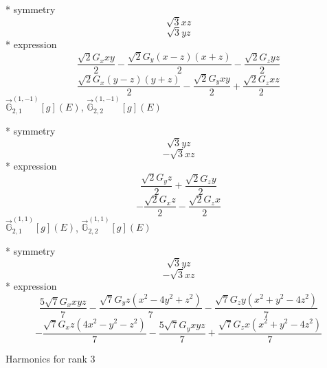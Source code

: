 \documentclass[fleqn,8pt]{jsarticle}
\begin{document}
\noindent\quad ** symmetry
\begin{dmath*}
\sqrt{3} x z
\end{dmath*}
\begin{dmath*}
\sqrt{3} y z
\end{dmath*}
\noindent\quad ** expression
\begin{dmath*}
\frac{\sqrt{2} G_{x} x y}{2} - \frac{\sqrt{2} G_{y} \left(x - z\right) \left(x + z\right)}{2} - \frac{\sqrt{2} G_{z} y z}{2}
\end{dmath*}
\begin{dmath*}
\frac{\sqrt{2} G_{x} \left(y - z\right) \left(y + z\right)}{2} - \frac{\sqrt{2} G_{y} x y}{2} + \frac{\sqrt{2} G_{z} x z}{2}
\end{dmath*}
\noindent\quad $\vec{\mathbb{G}}_{2,1}^{(1,-1)}[g](E)$, $\vec{\mathbb{G}}_{2,2}^{(1,-1)}[g](E)$

\noindent\quad ** symmetry
\begin{dmath*}
\sqrt{3} y z
\end{dmath*}
\begin{dmath*}
- \sqrt{3} x z
\end{dmath*}
\noindent\quad ** expression
\begin{dmath*}
\frac{\sqrt{2} G_{y} z}{2} + \frac{\sqrt{2} G_{z} y}{2}
\end{dmath*}
\begin{dmath*}
- \frac{\sqrt{2} G_{x} z}{2} - \frac{\sqrt{2} G_{z} x}{2}
\end{dmath*}
\noindent\quad $\vec{\mathbb{G}}_{2,1}^{(1,1)}[g](E)$, $\vec{\mathbb{G}}_{2,2}^{(1,1)}[g](E)$

\noindent\quad ** symmetry
\begin{dmath*}
\sqrt{3} y z
\end{dmath*}
\begin{dmath*}
- \sqrt{3} x z
\end{dmath*}
\noindent\quad ** expression
\begin{dmath*}
\frac{5 \sqrt{7} G_{x} x y z}{7} - \frac{\sqrt{7} G_{y} z \left(x^{2} - 4 y^{2} + z^{2}\right)}{7} - \frac{\sqrt{7} G_{z} y \left(x^{2} + y^{2} - 4 z^{2}\right)}{7}
\end{dmath*}
\begin{dmath*}
- \frac{\sqrt{7} G_{x} z \left(4 x^{2} - y^{2} - z^{2}\right)}{7} - \frac{5 \sqrt{7} G_{y} x y z}{7} + \frac{\sqrt{7} G_{z} x \left(x^{2} + y^{2} - 4 z^{2}\right)}{7}
\end{dmath*}

\noindent * Harmonics for rank 3
\end{document}
